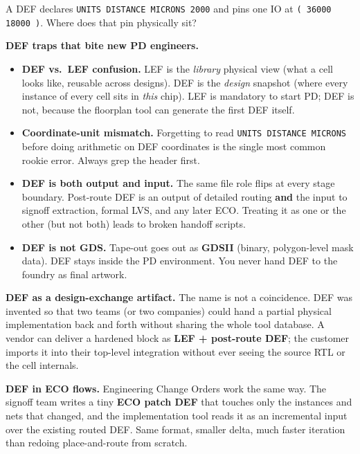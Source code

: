 \begin{gut}
A DEF declares \texttt{UNITS DISTANCE MICRONS 2000} and pins one IO at \texttt{( 36000 18000 )}. Where does that pin physically sit?
\end{gut}

\begin{pitfall}
\textbf{DEF traps that bite new PD engineers.}
\begin{itemize}
  \item \textbf{DEF vs.\ LEF confusion.} LEF is the \emph{library} physical view (what a cell looks like, reusable across designs). DEF is the \emph{design} snapshot (where every instance of every cell sits in \emph{this} chip). LEF is mandatory to start PD; DEF is not, because the floorplan tool can generate the first DEF itself.
  \item \textbf{Coordinate-unit mismatch.} Forgetting to read \texttt{UNITS DISTANCE MICRONS} before doing arithmetic on DEF coordinates is the single most common rookie error. Always grep the header first.
  \item \textbf{DEF is both output and input.} The same file role flips at every stage boundary. Post-route DEF is an output of detailed routing \textbf{and} the input to signoff extraction, formal LVS, and any later ECO. Treating it as one or the other (but not both) leads to broken handoff scripts.
  \item \textbf{DEF is not GDS.} Tape-out goes out as \textbf{GDSII} (binary, polygon-level mask data). DEF stays inside the PD environment. You never hand DEF to the foundry as final artwork.
\end{itemize}
\end{pitfall}

\begin{sidebar}
\textbf{DEF as a design-exchange artifact.} The name is not a coincidence. DEF was invented so that two teams (or two companies) could hand a partial physical implementation back and forth without sharing the whole tool database. A vendor can deliver a hardened block as \textbf{LEF + post-route DEF}; the customer imports it into their top-level integration without ever seeing the source RTL or the cell internals.

\textbf{DEF in ECO flows.} Engineering Change Orders work the same way. The signoff team writes a tiny \textbf{ECO patch DEF} that touches only the instances and nets that changed, and the implementation tool reads it as an incremental input over the existing routed DEF. Same format, smaller delta, much faster iteration than redoing place-and-route from scratch.
\end{sidebar}

